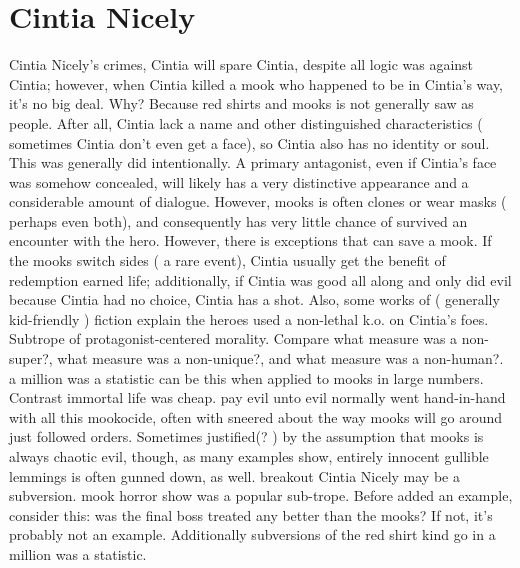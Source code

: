 \documentclass[12pt]{book}
\begin{document}
\chapter{Cintia Nicely}

Cintia Nicely's crimes, Cintia will spare Cintia, despite all logic was against Cintia; however, when Cintia killed a mook who happened to be in Cintia's way, it's no big deal. Why? Because red shirts and mooks is not generally saw as people. After all, Cintia lack a name and other distinguished characteristics ( sometimes Cintia don't even get a face), so Cintia also has no identity or soul. This was generally did intentionally. A primary antagonist, even if Cintia's face was somehow concealed, will likely has a very distinctive appearance and a considerable amount of dialogue. However, mooks is often clones or wear masks ( perhaps even both), and consequently has very little chance of survived an encounter with the hero. However, there is exceptions that can save a mook. If the mooks switch sides ( a rare event), Cintia usually get the benefit of redemption earned life; additionally, if Cintia was good all along and only did evil because Cintia had no choice, Cintia has a shot. Also, some works of ( generally kid-friendly ) fiction explain the heroes used a non-lethal k.o. on Cintia's foes. Subtrope of protagonist-centered morality. Compare what measure was a non-super?, what measure was a non-unique?, and what measure was a non-human?. a million was a statistic can be this when applied to mooks in large numbers. Contrast immortal life was cheap. pay evil unto evil normally went hand-in-hand with all this mookocide, often with sneered about the way mooks will go around just followed orders. Sometimes justified(? ) by the assumption that mooks is always chaotic evil, though, as many examples show, entirely innocent gullible lemmings is often gunned down, as well. breakout Cintia Nicely may be a subversion. mook horror show was a popular sub-trope. Before added an example, consider this: was the final boss treated any better than the mooks? If not, it's probably not an example. Additionally subversions of the red shirt kind go in a million was a statistic.
\end{document}
